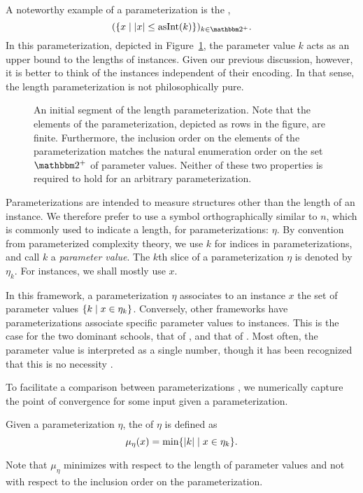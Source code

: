 \begin{example}
  A noteworthy example of a parameterization is the ,
  \begin{equation*}
    (\{x \st \length{x} \le \asNat(k)\})_{k \in \binary^+}.
  \end{equation*}
  In this parameterization, depicted in Figure~\ref{fig:length_parameterization}, the parameter value $k$ acts as an upper bound to the lengths of instances.
  Given our previous discussion, however, it is better to think of the instances independent of their encoding.
  In that sense, the length parameterization is not philosophically pure.
  \begin{figure}
  \caption{
    An initial segment of the length parameterization.
    Note that the elements of the parameterization, depicted as rows in the figure, are finite.
    Furthermore, the inclusion order on the elements of the parameterization matches the natural enumeration order on the set $\binary^+$ of parameter values.
    Neither of these two properties is required to hold for an arbitrary parameterization.
  }
  \label{fig:length_parameterization}
  \end{figure}
\end{example}

Parameterizations are intended to measure structures other than the length of an instance.
We therefore prefer to use a symbol orthographically similar to $n$, which is commonly used to indicate a length, for parameterizations: $\eta$.
By convention from parameterized complexity theory, we use $k$ for indices in parameterizations, and call $k$ a \emph{parameter value}.
The $k$th slice of a parameterization $\eta$ is denoted by $\eta_k$.
For instances, we shall mostly use $x$.

In this framework, a parameterization $\eta$ associates to an instance $x$ the set of parameter values $\{k \;{|}\; x \in \eta_k\}$.
Conversely, other frameworks have parameterizations associate specific parameter values to instances.
This is the case for the two dominant schools, that of \textcite{downey1999parameterized}, and that of \textcite{flum2006parameterized}.
Most often, the parameter value is interpreted as a single number, though it has been recognized that this is no necessity \parencite{fellows2013towards,niedermeier2010reflections}.

To facilitate a comparison between parameterizations \parencite{komusiewicz2012new}, we numerically capture the point of convergence for some input given a parameterization.
\begin{definition}
  Given a parameterization $\eta$, the  of $\eta$ is defined as
  \begin{equation*}
    \mu_\eta(x) = \min\{{\lvert k\rvert} \;{|}\; x \in \eta_k\}.
  \end{equation*}
\end{definition}
Note that $\mu_\eta$ minimizes with respect to the length of parameter values and not with respect to the inclusion order on the parameterization.

